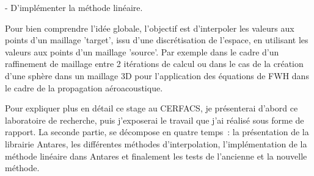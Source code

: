 - D'implémenter la méthode linéaire.  %

\vspace{0,5cm}

Pour bien comprendre l'idée globale, l'objectif est d'interpoler les valeurs aux points d'un maillage 'target', issu d'une discrétisation de l'espace, en utilisant les valeurs aux points d'un maillage 'source'. Par exemple dans le cadre d'un raffinement de maillage entre 2 itérations de calcul ou dans le cas de la création d'une sphère dans un maillage 3D pour l'application des équations de FWH dans le cadre de la propagation aéroacoustique.

\vspace{0,5cm}

Pour expliquer plus en détail ce stage au CERFACS, je présenterai d'abord ce laboratoire de recherche, puis j'exposerai le travail que j'ai réalisé sous forme de rapport. La seconde partie, se décompose en quatre temps : la présentation de la librairie Antares, les différentes méthodes d'interpolation, l'implémentation de la méthode linéaire dans Antares et finalement les tests de l'ancienne et la nouvelle méthode.

% 
% 